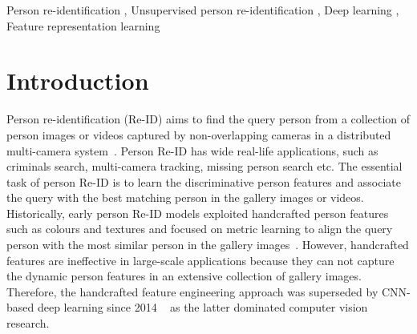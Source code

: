 \documentclass[a4paper,fleqn]{cas-dc}
\begin{document}


\begin{keywords}
Person re-identification
\sep  
Unsupervised person re-identification
\sep
Deep learning
\sep
Feature representation learning
\end{keywords}

\maketitle

\section{Introduction}

Person re-identification (Re-ID) aims to find the query person from a collection of person images or videos captured by non-overlapping cameras in a distributed multi-camera system~\cite{LiuCCPZYH20,LiLCYPZ19,ChengGCSHZ18}. Person Re-ID has wide real-life applications, such as criminals search, multi-camera tracking, missing person search etc. The essential task of person Re-ID is to learn the discriminative person features and associate the query with the best matching person in the gallery images or videos.  Historically, early person Re-ID models exploited handcrafted person features such as colours and textures and focused on metric learning to align the query person with the most similar person in the gallery images~\cite{LiuCCY18,ChengCLHGZ17,LiuC0Y17}. However, handcrafted features are ineffective in large-scale applications because they can not capture the dynamic person features in an extensive collection of gallery images. Therefore, the handcrafted feature engineering approach was superseded by CNN-based deep learning since 2014 ~\cite{li_deepreid_2014}  as the latter dominated computer vision research. 
\end{document}
